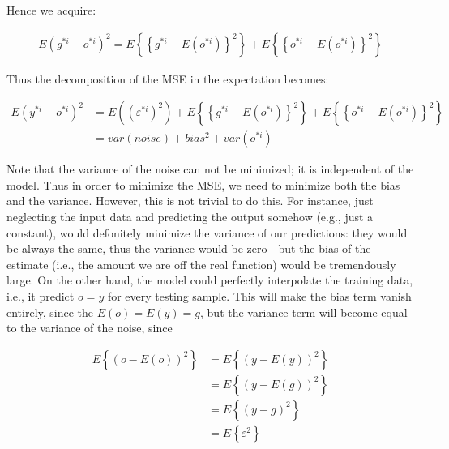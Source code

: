 \documentclass[runningheads,openany]{xhlPaper}
\begin{document}
Hence we acquire:

\begin{displaymath}
\begin{aligned}
E\left ( g^{*i}-o^{*i} \right )^2 =E\left \{ \left \{ g^{*i} - E\left ( o^{*i} \right ) \right \}^2 \right \}+E\left \{ \left \{ o^{*i} - E\left ( o^{*i} \right ) \right \}^2 \right \}
\end{aligned}
\end{displaymath}

Thus the decomposition of the MSE in the expectation becomes:

\begin{displaymath}
\begin{aligned}
E\left ( y^{*i}-o^{*i} \right )^2&=E\left ( \left(\varepsilon^{*i}\right)^2  \right )+E\left \{ \left \{ g^{*i} - E\left ( o^{*i} \right ) \right \}^2 \right \}+E\left \{ \left \{ o^{*i} - E\left ( o^{*i} \right ) \right \}^2 \right \}\\
&=var\left(noise\right) + bias^2 + var\left(o^{*i}\right)
\end{aligned}
\end{displaymath}

Note that the variance of the noise can not be minimized; it is independent of the model.
Thus in order to minimize the MSE, we need to minimize both the bias and the variance.
However, this is not trivial to do this. For instance, just neglecting the input data and predicting the output somehow (e.g., just a constant), would defonitely minimize the variance of our predictions: they would be always the same, thus the variance would be zero - but the bias of the estimate (i.e., the amount we are off the real function) would be tremendously large. 
On the other hand, the model could perfectly interpolate the training data, i.e., it predict $o=y$ for every testing sample. 
This will make the bias term vanish entirely, since the $E\left(o\right)=E\left(y\right)=g$, but the variance term will become equal to the variance of the noise, since 

\begin{displaymath}
\begin{aligned}
E\left \{ \left ( o - E\left ( o \right ) \right )^2 \right \}&=E\left \{ \left ( y - E\left ( y \right ) \right )^2 \right \}\\
&=E\left \{ \left ( y - E\left ( g \right ) \right )^2 \right \}\\
&=E\left \{ \left ( y - g\right )^2 \right \}\\
&=E\left \{ \varepsilon ^2 \right \}
\end{aligned}
\end{displaymath}
\end{document}
